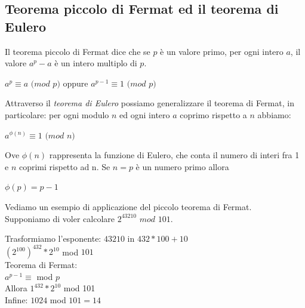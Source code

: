 \documentclass[11pt, oneside]{article}   	%
\begin{document}
\subsection*{Teorema piccolo di Fermat ed il teorema di Eulero}
Il teorema piccolo di Fermat dice che se $p$ è un valore primo, per ogni intero $a$, il valore $a^p-a$ è un intero multiplo di $p$.
\begin{center}
$a^p \equiv a$ $(mod$ $p )$  oppure  $a^{p-1}\equiv 1$ $(mod$ $p )$
\end{center}
Attraverso il \emph{teorema di Eulero} possiamo generalizzare il teorema di Fermat, in particolare: per ogni modulo $n$ ed ogni intero $a$ coprimo rispetto a $n$ abbiamo:
\begin{center}
$a^{\phi(n)} \equiv 1$ $(mod$ $n)$
\end{center}
Ove $\phi(n)$ rappresenta la funzione di Eulero, che conta il numero di interi fra 1 e $n$ coprimi rispetto ad n. Se $n = p$ è un numero primo allora 
\begin{center}
$\phi(p) = p-1$
\end{center}
Vediamo un esempio di applicazione del piccolo teorema di Fermat.\\
Supponiamo di voler calcolare $2^{43210}$ $mod$ $101$.
\begin{center}
Trasformiamo l'esponente: $43210$ in  $432*100 + 10$\\
$(2^{100})^{432}  * 2^{10}$ mod $101$\\ 
Teorema di Fermat: \\$a^{p-1}\equiv$ mod $p$\\
Allora $1^{432} * 2^{10} $ mod 101\\
Infine: $1024$ mod $101 = 14$
\end{center}
\end{document}
